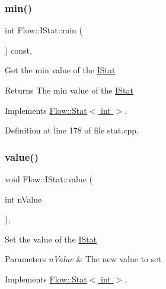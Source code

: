 \subsubsection{\texorpdfstring{min()}{min()}\hspace{0.1cm}{\footnotesize\ttfamily [2/2]}}
{\footnotesize\ttfamily int Flow\+::\+I\+Stat\+::min (\begin{DoxyParamCaption}{ }\end{DoxyParamCaption}) const\hspace{0.3cm}{\ttfamily [override]}, {\ttfamily [virtual]}}

Get the min value of the \hyperlink{class_flow_1_1_i_stat}{I\+Stat} \begin{DoxyReturn}{Returns}
The min value of the \hyperlink{class_flow_1_1_i_stat}{I\+Stat} 
\end{DoxyReturn}


Implements \hyperlink{class_flow_1_1_stat_a7cf2be39e64fb4da988b604b92a85d28}{Flow\+::\+Stat$<$ int $>$}.



Definition at line 178 of file stat.\+cpp.

\hypertarget{class_flow_1_1_i_stat_aff7abbcc9c44f1f07ed956f9d571c674}{}\label{class_flow_1_1_i_stat_aff7abbcc9c44f1f07ed956f9d571c674} 
\subsubsection{\texorpdfstring{value()}{value()}\hspace{0.1cm}{\footnotesize\ttfamily [1/2]}}
{\footnotesize\ttfamily void Flow\+::\+I\+Stat\+::value (\begin{DoxyParamCaption}\item[{int}]{n\+Value }\end{DoxyParamCaption})\hspace{0.3cm}{\ttfamily [override]}, {\ttfamily [virtual]}}

Set the value of the \hyperlink{class_flow_1_1_i_stat}{I\+Stat} 
\begin{DoxyParams}{Parameters}
{\em n\+Value} & The new value to set \\
\hline
\end{DoxyParams}


Implements \hyperlink{class_flow_1_1_stat_ab28bdb79f7d6444f1e341a62ef039b96}{Flow\+::\+Stat$<$ int $>$}.



